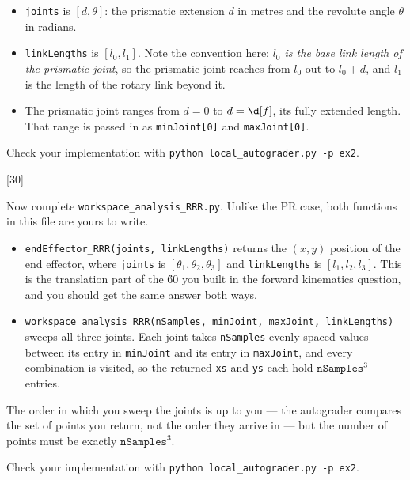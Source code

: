 \documentclass{16384_doc}
\begin{document}
\begin{questions}
\begin{itemize}
    \item \verb!joints! is $[d, \theta]$: the prismatic extension $d$ in metres
        and the revolute angle $\theta$ in radians.
    \item \verb!linkLengths! is $[l_0, l_1]$. Note the convention here:
        \emph{$l_0$ is the base link length of the prismatic joint}, so the
        prismatic joint reaches from $l_0$ out to $l_0 + d$, and $l_1$ is the
        length of the rotary link beyond it.
    \item The prismatic joint ranges from $d = 0$ to $d = \d[f]$, its fully
        extended length. That range is passed in as \verb!minJoint[0]! and
        \verb!maxJoint[0]!.
\end{itemize}


Check your implementation with \verb!python local_autograder.py -p ex2!.

[30]

Now complete \verb!workspace_analysis_RRR.py!. Unlike the PR case, both
functions in this file are yours to write.

\begin{itemize}
    \item \verb!endEffector_RRR(joints, linkLengths)! returns the $(x, y)$
        position of the end effector, where \verb!joints! is
        $[\theta_1, \theta_2, \theta_3]$ and \verb!linkLengths! is
        $[l_1, l_2, l_3]$. This is the translation part of the \H{6}{0} you
        built in the forward kinematics question, and you should get the same
        answer both ways.
    \item \verb!workspace_analysis_RRR(nSamples, minJoint, maxJoint, linkLengths)!
        sweeps all three joints. Each joint takes \verb!nSamples! evenly spaced
        values between its entry in \verb!minJoint! and its entry in
        \verb!maxJoint!, and every combination is visited, so the returned
        \verb!xs! and \verb!ys! each hold $\mathtt{nSamples}^3$ entries.
\end{itemize}

The order in which you sweep the joints is up to you --- the autograder
compares the set of points you return, not the order they arrive in --- but the
number of points must be exactly $\mathtt{nSamples}^3$.

Check your implementation with \verb!python local_autograder.py -p ex2!.

\end{questions}
\end{document}
